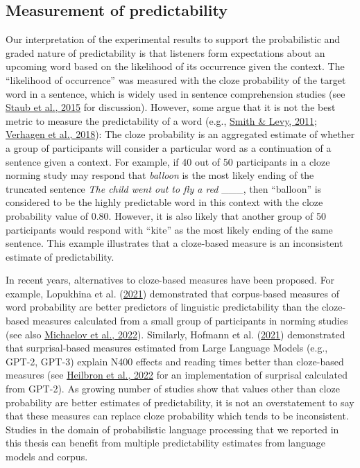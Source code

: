 \documentclass[a4paper, nobind]{templates/ociamthesis}
\begin{document}
\hypertarget{measurement-of-predictability}{%
\subsection{Measurement of predictability}\label{measurement-of-predictability}}

Our interpretation of the experimental results to support the probabilistic and graded nature of predictability is that listeners form expectations about an upcoming word based on the likelihood of its occurrence given the context.
The ``likelihood of occurrence'' was measured with the cloze probability of the target word in a sentence,
which is widely used in sentence comprehension studies (see \protect\hyperlink{ref-Staub2015a}{Staub et al., 2015} for discussion).
However, some argue that it is not the best metric to measure the predictability of a word (e.g., \protect\hyperlink{ref-Smith2011}{Smith \& Levy, 2011}; \protect\hyperlink{ref-Verhagen2018}{Verhagen et al., 2018}):
The cloze probability is an aggregated estimate of whether a group of participants will consider a particular word as a continuation of a sentence given a context.
For example, if 40 out of 50 participants in a cloze norming study may respond that \emph{balloon} is the most likely ending of the truncated sentence \emph{The child went out to fly a red} \_\_\_,
then ``balloon'' is considered to be the highly predictable word in this context with the cloze probability value of 0.80.
However, it is also likely that another group of 50 participants would respond with ``kite'' as the most likely ending of the same sentence.
This example illustrates that a cloze-based measure is an inconsistent estimate of predictability.

In recent years, alternatives to cloze-based measures have been proposed.
For example, Lopukhina et al. (\protect\hyperlink{ref-Lopukhina2021}{2021}) demonstrated that corpus-based measures of word probability are better predictors of linguistic predictability than the cloze-based measures calculated from a small group of participants in norming studies (see also \protect\hyperlink{ref-Michaelov2022}{Michaelov et al., 2022}).
Similarly, Hofmann et al. (\protect\hyperlink{ref-Hofmann2021}{2021}) demonstrated that surprisal-based measures estimated from Large Language Models (e.g., GPT-2, GPT-3) explain N400 effects and reading times better than cloze-based measures (see \protect\hyperlink{ref-Heilbron2022}{Heilbron et al., 2022} for an implementation of surprisal calculated from GPT-2).
As growing number of studies show that values other than cloze probability are better estimates of predictability,
it is not an overstatement to say that these measures can replace cloze probability which tends to be inconsistent.
Studies in the domain of probabilistic language processing that we reported in this thesis can benefit from multiple predictability estimates from language models and corpus.
\end{document}
